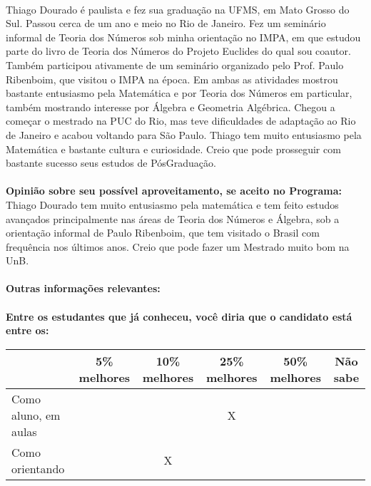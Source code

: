 \documentclass[11pt]{article}
\begin{document}
\\Thiago Dourado é paulista e fez sua graduação na UFMS, em Mato Grosso do Sul. Passou cerca de um ano e meio no Rio de Janeiro. Fez um seminário informal de Teoria dos Números sob minha orientação no IMPA, em que estudou parte do livro de Teoria dos Números do Projeto Euclides do qual sou coautor. Também participou ativamente de um seminário organizado pelo Prof. Paulo Ribenboim, que visitou o IMPA na época. Em ambas as atividades mostrou bastante entusiasmo pela Matemática e por Teoria dos Números em particular, também mostrando interesse por Álgebra e Geometria Algébrica. Chegou a começar o mestrado na PUC do Rio, mas teve dificuldades de adaptação ao Rio de Janeiro e acabou voltando para São Paulo. Thiago tem muito entusiasmo pela Matemática e bastante cultura e curiosidade. Creio que pode prosseguir com bastante sucesso seus estudos de PósGraduação.\\
\\
\textbf{Opinião sobre seu possível aproveitamento, se aceito no Programa:}
\\Thiago Dourado tem muito entusiasmo pela matemática e tem feito estudos avançados principalmente nas áreas de Teoria dos Números e Álgebra, sob a orientação informal de Paulo Ribenboim, que tem visitado o Brasil com frequência nos últimos anos. Creio que pode fazer um Mestrado muito bom na UnB.\\ 
\\
\textbf{Outras informações relevantes:} \\
\\[0.3cm]
\textbf{Entre os estudantes que já conheceu, você diria que o candidato está entre os:}
\\
\begin{tabular}{|l|c|c|c|c|c|}
\hline
 & 5\% melhores & 10\% melhores & 25\% melhores & 50\% melhores & Não sabe \\
\hline
Como aluno, em aulas &  &  & X &  & \\
\hline
Como orientando &  & X &  &  & \\
\hline
\end{tabular}
\end{document}
